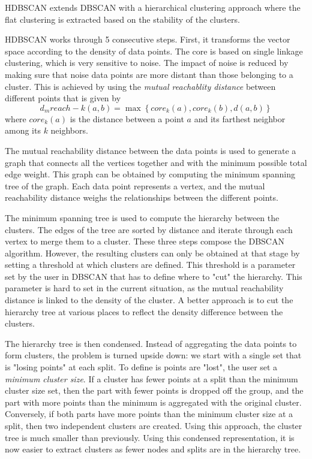 HDBSCAN extends DBSCAN with a hierarchical clustering approach where the flat clustering is extracted based on the stability of the clusters.

HDBSCAN works through 5 consecutive steps.
First, it transforms the vector space according to the density of data points.
The core is based on single linkage clustering, which is very sensitive to noise.
The impact of noise is reduced by making sure that noise data points are more distant than those belonging to a cluster.
This is achieved by using the \textit{mutual reachablity distance} between different points
that is given by
\[d_mreach-k (a,b) = \max \left\{core_k (a),core_k (b),d(a,b)\right\}\]
where \(core_k(a)\) is the distance between a point \(a\) and its farthest neighbor among
its \(k\) neighbors.

The mutual reachability distance between the data points is used to generate a graph that connects all the vertices together and with the minimum possible total edge weight.
This graph can be obtained by computing the minimum spanning tree of the graph.
Each data point represents a vertex, and the mutual reachability distance weighs the relationships between the different points.

The minimum spanning tree is used to compute the hierarchy between the clusters.
The edges of the tree are sorted by distance and iterate through each vertex to merge them to a cluster.
These three steps compose the DBSCAN algorithm.
However, the resulting clusters can only be obtained at that stage by setting a threshold at which clusters are defined.
This threshold is a parameter set by the user in DBSCAN that has to define where to "cut" the hierarchy.
This parameter is hard to set in the current situation, as the mutual reachability distance is linked to the density of the cluster.
A better approach is to cut the hierarchy tree at various places to reflect the density difference between the clusters.

The hierarchy tree is then condensed.
Instead of aggregating the data points to form clusters, the problem is turned upside down: we start with a single set that is "losing points" at each split.
To define is points are "lost", the user set a \textit{minimum cluster size}.
If a cluster has fewer points at a split than the minimum cluster size set, then the part with fewer points is dropped off the group, and the part with more points than the minimum is aggregated with the original cluster.
Conversely, if both parts have more points than the minimum cluster size at a split, then two independent clusters are created.
Using this approach, the cluster tree is much smaller than previously.
Using this condensed representation, it is now easier to extract clusters as fewer nodes and splits are in the hierarchy tree.

